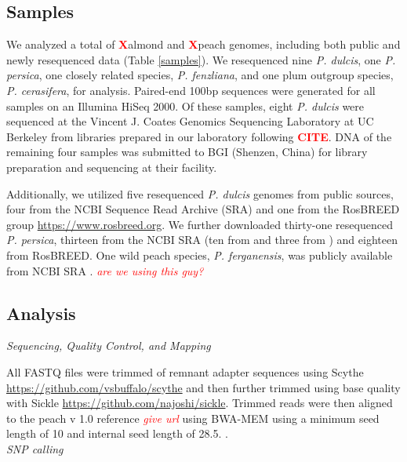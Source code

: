 \documentclass[12pt]{article}
\newcommand{\citex}{\textcolor{red}{\bf CITE}}
\newcommand{\X}{\textcolor{red}{\bf X}}
\newcommand{\jri}[1]{\textcolor{red}{ \emph{ #1}} }
\begin{document}
\subsection*{Samples}
We analyzed a total of \X almond and \X peach genomes, including both public and newly resequenced data (Table \ref{samples}). We resequenced nine \emph{P. dulcis}, one \emph{P. persica}, one closely related species, \emph{P. fenzliana}, and one plum outgroup species, \emph{P. cerasifera}, for analysis.
%
Paired-end 100bp sequences were generated for all samples on an Illumina HiSeq 2000. 
%
Of these samples, eight \emph{P. dulcis} were sequenced at the Vincent J. Coates Genomics Sequencing Laboratory at UC Berkeley from libraries prepared in our laboratory following \citex. 
DNA of the remaining four samples was submitted to BGI (Shenzen, China) for library preparation and sequencing at their facility.
%

Additionally, we utilized five resequenced \emph{P. dulcis} genomes from public sources, four from \citealt{koepke2013comparative} 
the NCBI Sequence Read Archive (SRA) and one from the RosBREED group \url{https://www.rosbreed.org}.
%
We further downloaded thirty-one resequenced \emph{P. persica}, thirteen from the NCBI SRA (ten from \citealt{verde2013high} and three from \citealt{ahmad2011whole}) and eighteen from RosBREED.
%
One wild peach species, \emph{P. ferganensis}, was publicly available from NCBI SRA \citep{verde2013high}. \jri{are we using this guy?}\\
%
%
\subsection*{Analysis}
\emph{Sequencing, Quality Control, and Mapping}

%
All FASTQ files were trimmed of remnant adapter sequences using Scythe \url{https://github.com/vsbuffalo/scythe} and then further trimmed using base quality with Sickle \url{https://github.com/najoshi/sickle}. 
%
Trimmed reads were then aligned to the peach v 1.0 reference \jri{give url} using BWA-MEM  \citep{li2013aligning} using a minimum seed length of 10 and internal seed length of 28.5.
%
. 
%
\\
\emph{SNP calling}
\end{document}
